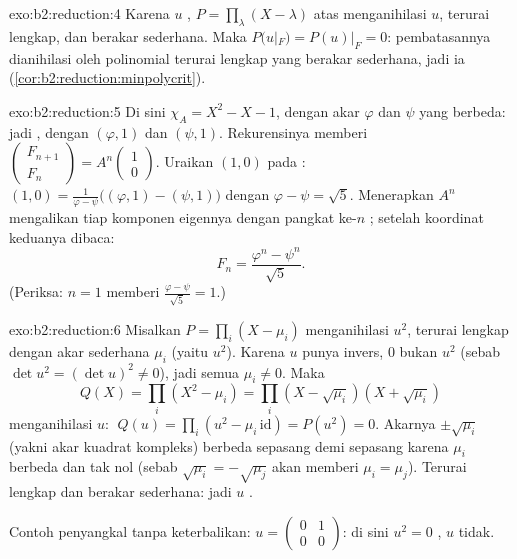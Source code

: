 \begin{solution}{exo:b2:reduction:4}
Karena $u$ , $P = \prod_{\lambda}(X - \lambda)$ atas
 menganihilasi $u$, terurai lengkap, dan berakar sederhana.
Maka $P(u|_F) = P(u)|_F = 0$: pembatasannya dianihilasi oleh polinomial
terurai lengkap yang berakar sederhana, jadi ia 
(\cref{cor:b2:reduction:minpolycrit}).
\end{solution}

\begin{solution}{exo:b2:reduction:5}
Di sini $\chi_A = X^2 - X - 1$, dengan akar $\varphi$ dan $\psi$ yang
berbeda: jadi , dengan  $(\varphi, 1)$ dan
$(\psi, 1)$. Rekurensinya memberi $\begin{pmatrix} F_{n+1}\\ F_n
\end{pmatrix} = A^n \begin{pmatrix}1\\ 0\end{pmatrix}$. Uraikan $(1, 0)$
pada : $(1,0) = \frac{1}{\varphi - \psi}\bigl((\varphi, 1)
- (\psi, 1)\bigr)$ dengan $\varphi - \psi = \sqrt5$. Menerapkan $A^n$
mengalikan tiap komponen eigennya dengan pangkat ke-$n$ ;
setelah koordinat keduanya dibaca:
\[
F_n = \frac{\varphi^n - \psi^n}{\sqrt 5} .
\]
(Periksa: $n = 1$ memberi $\frac{\varphi - \psi}{\sqrt5} = 1$.)
\end{solution}

\begin{solution}{exo:b2:reduction:6}
Misalkan $P = \prod_i (X - \mu_i)$ menganihilasi $u^2$, terurai lengkap
dengan akar sederhana $\mu_i$ (yaitu  $u^2$). Karena $u$ punya
invers, $0$ bukan  $u^2$ (sebab $\det u^2 = (\det u)^2 \neq
0$), jadi semua $\mu_i \neq 0$. Maka
\[
Q(X) = \prod_i (X^2 - \mu_i) = \prod_i (X - \sqrt{\mu_i})(X +
\sqrt{\mu_i})
\]
menganihilasi $u$: $\;Q(u) = \prod_i (u^2 - \mu_i\,\mathrm{id}) =
P(u^2) = 0$. Akarnya $\pm
\sqrt{\mu_i}$ (yakni akar kuadrat kompleks) berbeda sepasang demi sepasang
karena $\mu_i$ berbeda dan tak nol (sebab $\sqrt{\mu_i} = -\sqrt{\mu_j}$
akan memberi $\mu_i = \mu_j$). Terurai lengkap dan berakar sederhana:
jadi $u$ .

Contoh penyangkal tanpa keterbalikan: $u = \begin{pmatrix} 0 & 1\\
0 & 0\end{pmatrix}$: di sini $u^2 = 0$ , $u$ tidak.
\end{solution}

